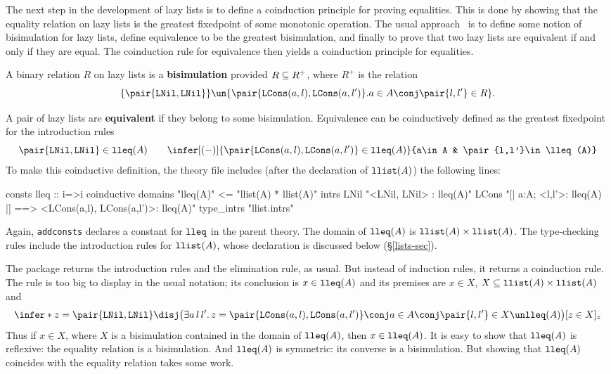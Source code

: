 The next step in the development of lazy lists is to define a coinduction
principle for proving equalities.  This is done by showing that the equality
relation on lazy lists is the greatest fixedpoint of some monotonic
operation.  The usual approach~\cite{pitts94} is to define some notion of 
bisimulation for lazy lists, define equivalence to be the greatest
bisimulation, and finally to prove that two lazy lists are equivalent if and
only if they are equal.  The coinduction rule for equivalence then yields a
coinduction principle for equalities.

A binary relation $R$ on lazy lists is a {\bf bisimulation} provided $R\subseteq
R^+$, where $R^+$ is the relation
\[ \{\pair{\LNil,\LNil}\} \un 
   \{\pair{\LCons(a,l),\LCons(a,l')} . a\in A \conj \pair{l,l'}\in R\}.
\]

A pair of lazy lists are {\bf equivalent} if they belong to some bisimulation. 
Equivalence can be coinductively defined as the greatest fixedpoint for the
introduction rules
\[  \pair{\LNil,\LNil} \in\lleq(A)  \qquad 
    \infer[(-)]{\pair{\LCons(a,l),\LCons(a,l')} \in\lleq(A)}
          {a\in A & \pair{l,l'}\in \lleq(A)}
\]
To make this coinductive definition, the theory file includes (after the
declaration of $\hbox{\tt llist}(A)$) the following lines:
\begin{ttbox}
consts    lleq :: i=>i
coinductive
  domains "lleq(A)" <= "llist(A) * llist(A)"
  intrs
    LNil  "<LNil, LNil> : lleq(A)"
    LCons "[| a:A; <l,l'>: lleq(A) |] ==> <LCons(a,l), LCons(a,l')>: lleq(A)"
  type_intrs  "llist.intrs"
\end{ttbox}
Again, {\tt addconsts} declares a constant for $\hbox{\tt lleq}$ in the parent theory. 
The domain of $\hbox{\tt lleq}(A)$ is $\hbox{\tt llist}(A)\times\hbox{\tt llist}(A)$.  The type-checking
rules include the introduction rules for $\hbox{\tt llist}(A)$, whose 
declaration is discussed below (\S\ref{lists-sec}).

The package returns the introduction rules and the elimination rule, as
usual.  But instead of induction rules, it returns a coinduction rule.
The rule is too big to display in the usual notation; its conclusion is
$x\in\hbox{\tt lleq}(A)$ and its premises are $x\in X$, 
${X\subseteq\hbox{\tt llist}(A)\times\hbox{\tt llist}(A)}$ and
\[ \infer*{z=\pair{\LNil,\LNil}\disj \bigl(\exists a\,l\,l'.\,
      z=\pair{\LCons(a,l),\LCons(a,l')} \conj 
      a\in A \conj\pair{l,l'}\in X\un\lleq(A) \bigr)
    }{[z\in X]_z}
\]
Thus if $x\in X$, where $X$ is a bisimulation contained in the
domain of $\hbox{\tt lleq}(A)$, then $x\in\hbox{\tt lleq}(A)$.  It is easy to show that
$\hbox{\tt lleq}(A)$ is reflexive: the equality relation is a bisimulation.  And
$\hbox{\tt lleq}(A)$ is symmetric: its converse is a bisimulation.  But showing that
$\hbox{\tt lleq}(A)$ coincides with the equality relation takes some work.

